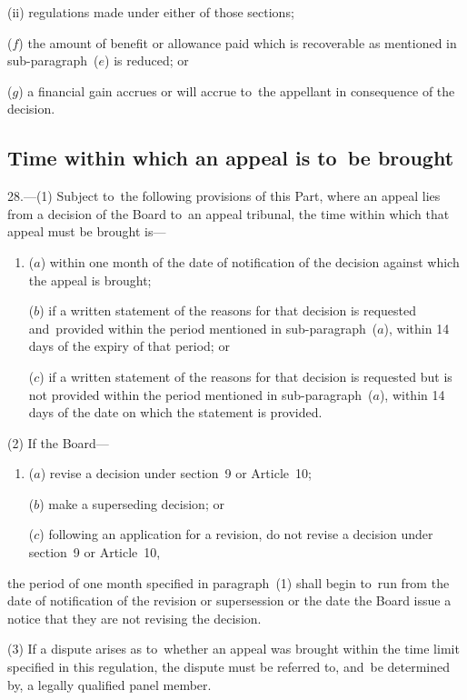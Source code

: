 \documentclass[12pt,a4paper]{article}
\begin{document}
\begin{enumerate}
\begin{enumerate}
(ii) regulations made under either of those sections;
\end{enumerate}

($f$) the amount of benefit or allowance paid which is recoverable as mentioned in sub-paragraph~($e$)  is reduced; or

($g$) a financial gain accrues or will accrue to~the appellant in consequence of the decision.
\end{enumerate}

\subsection[28. Time within which an appeal is to~be brought]{Time within which an appeal is to~be brought}

28.---(1)  Subject to~the following provisions of this Part, where an appeal lies from a decision of the Board to~an appeal tribunal, the time within which that appeal must be brought is—
\begin{enumerate}\item[]
($a$) within one month of the date of notification of the decision against which the appeal is brought;

($b$) if a written statement of the reasons for that decision is requested and~provided within the period mentioned in sub-paragraph~($a$), within 14 days of the expiry of that period; or

($c$) if a written statement of the reasons for that decision is requested but is not provided within the period mentioned in sub-paragraph~($a$), within 14 days of the date on which the statement is provided.
\end{enumerate}

(2) If the Board—
\begin{enumerate}\item[]
($a$) revise a decision under section~9 or Article~10;

($b$) make a superseding decision; or

($c$) following an application for a revision, do not revise a decision under section~9 or Article~10,
\end{enumerate}
the period of one month specified in paragraph~(1) shall begin to~run from the date of notification of the revision or supersession or the date the Board issue a notice that they are not revising the decision.

(3) If a dispute arises as to~whether an appeal was brought within the time limit specified in this regulation, the dispute must be referred to, and~be determined by, a legally qualified panel member.
\end{document}
